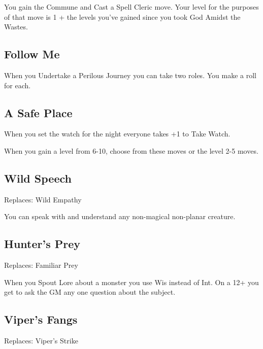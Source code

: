 You gain the Commune and Cast a Spell Cleric move. Your level for the purposes of that move is 1 + the levels you've gained since you took God Amidst the Wastes.

 
\subsection{Follow Me}   
 

When you Undertake a Perilous Journey you can take two roles. You make a roll for each.

 
\subsection{A Safe Place}    
 

When you set the watch for the night everyone takes +1 to Take Watch.

 
\startInstructions
When you gain a level from 6-10, choose from these moves or the level 2-5 moves.
\stopInstructions
 
\subsection{Wild Speech}    
 

Replaces: Wild Empathy

 

You can speak with and understand any non-magical non-planar creature.

 
\subsection{Hunter's Prey}    
 

Replaces: Familiar Prey

 

When you Spout Lore about a monster you use Wis instead of Int. On a 12+ you get to ask the GM any one question about the subject.

 
\subsection{Viper's Fangs}    
 

Replaces: Viper's Strike

 

